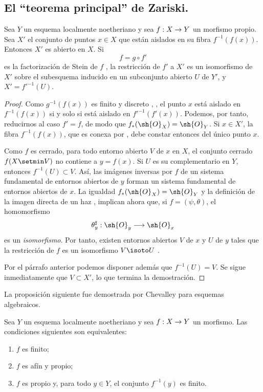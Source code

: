 \documentclass[oneside]{amsart}
\makeatletter
\newcommand{\ega@arrow}[2]{\mathchoice{#1}{#2}{#2}{#2}}
\renewcommand{\to}{\ega@arrow{\longrightarrow}{\rightarrow}}
\newcommand{\oldpage}[2][]{{\marginnote{\normalfont\textbf{#1}~|~#2}}\ignorespaces}
\let\EGAOriginalLabel\label
\renewcommand{\label}[1]{\phantomsection\EGAOriginalLabel{#1}}
\makeatother
\begin{document}
\subsection{El ``teorema principal'' de Zariski.}
\label{subsection:III.4.4}

\begin{proposition}[4.4.1]
\label{III.4.4.1}
Sea $Y$ un esquema localmente noetheriano y sea $f:X\to Y$ un
morfismo propio. Sea $X'$ el conjunto de puntos $x\in X$ que están
aislados en su fibra $f^{-1}(f(x))$. Entonces $X'$ es abierto en $X$.
Si
\[
  f=g\circ f'
\]
es la factorización de Stein de $f$ , la restricción
de $f'$ a $X'$ es un isomorfismo de $X'$ sobre el subesquema inducido
en un subconjunto abierto $U$ de $Y'$, y
$X'=f'^{-1}(U)$.
\end{proposition}

\begin{proof}
Como $g^{-1}(f(x))$ es finito y discreto
, , el punto $x$ está aislado en
$f^{-1}(f(x))$ si y solo si está aislado en
$f'^{-1}(f'(x))$. Podemos, por tanto, reducirnos al caso $f'=f$, de
modo que $f_*(\sh{O}_X)=\sh{O}_Y$. Si $x\in X'$, la fibra
$f^{-1}(f(x))$, que es conexa por , debe constar
entonces del único punto $x$.

Como $f$ es cerrado, para todo entorno abierto $V$ de $x$ en $X$, el
conjunto cerrado $f(X\setmin V)$ no contiene a $y=f(x)$. Si $U$ es su
complementario en $Y$, entonces $f^{-1}(U)\subset V$. Así, las
imágenes inversas por $f$ de un sistema fundamental de entornos
abiertos de $y$ forman un sistema fundamental de entornos abiertos de
$x$. La igualdad $f_*(\sh{O}_X)=\sh{O}_Y$ y la definición de la
imagen directa de un haz ,  implican
ahora que, si $f=(\psi,\theta)$, el homomorfismo
\[
  \theta_y^\sharp:\sh{O}_y\longrightarrow\sh{O}_x
\]
es un \emph{isomorfismo}. Por tanto, existen entornos abiertos $V$ de $x$ y
$U$ de $y$ tales que la restricción de $f$ es un isomorfismo
$V\isoto U$ .

\oldpage[III]{136}

Por el párrafo anterior podemos disponer además que
$f^{-1}(U)=V$. Se sigue inmediatamente que $V\subset X'$, lo que
termina la demostración.
\end{proof}

La proposición siguiente fue demostrada por Chevalley para esquemas
algebraicos.

\begin{proposition}[4.4.2]
\label{III.4.4.2}
Sea $Y$ un esquema localmente noetheriano y sea $f:X\to Y$ un
morfismo. Las condiciones siguientes son equivalentes:
\begin{enumerate}
  \item[{\rm a)}] $f$ es finito;
  \item[{\rm b)}] $f$ es afín y propio;
  \item[{\rm c)}] $f$ es propio y, para todo $y\in Y$, el conjunto
    $f^{-1}(y)$ es finito.
\end{enumerate}
\end{proposition}
\end{document}
